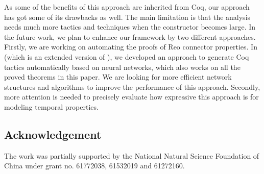 \documentclass[preprint,3p]{elsarticle}
\newcommand{\xy}[1]{{#1}}
\begin{document}
As some of the benefits of this approach are inherited from Coq, our approach has got some of its drawbacks as well.
The main limitation is that the analysis needs much more tactics and techniques when the constructor becomes large.
In the future work, we plan to enhance our framework by two different approaches.
\xy{
  Firstly, we are working on automating the proofs of Reo connector properties. In \cite{Foclasa17SCP} (which is an extended version of \cite{Foclasa17}), we developed an approach to generate Coq tactics automatically based on neural networks, which also works on all the proved theorems in this paper. We are looking for more efficient network structures and algorithms to improve the performance of this approach.
  }
Secondly, more attention is needed to precisely
evaluate how expressive this approach is for modeling temporal properties.

\subsection*{Acknowledgement}
\noindent The work was partially supported by the National Natural Science Foundation of China under grant no. 61772038, 61532019 and 61272160.
\end{document}
